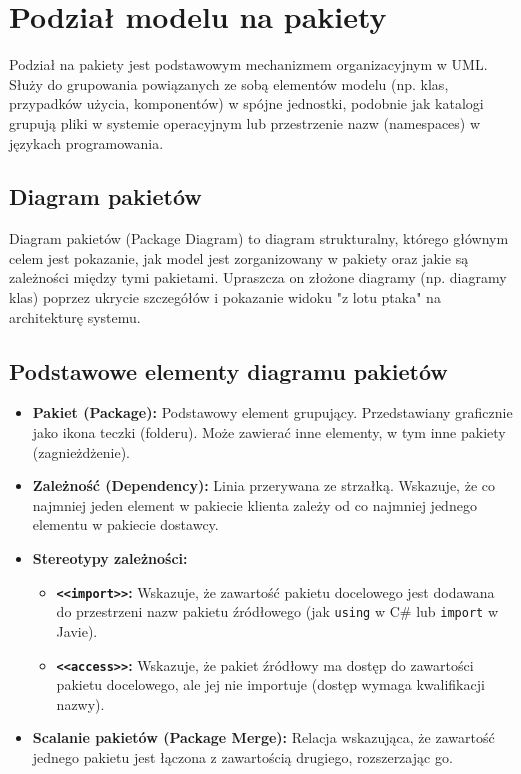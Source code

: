 \documentclass[a4paper,12pt]{article}
\begin{document}
\section{Podział modelu na pakiety}

Podział na pakiety jest podstawowym mechanizmem organizacyjnym w UML. Służy do grupowania powiązanych ze sobą elementów modelu (np. klas, przypadków użycia, komponentów) w spójne jednostki, podobnie jak katalogi grupują pliki w systemie operacyjnym lub przestrzenie nazw (namespaces) w językach programowania.

\subsection{Diagram pakietów}

Diagram pakietów (Package Diagram) to diagram strukturalny, którego głównym celem jest pokazanie, jak model jest zorganizowany w pakiety oraz jakie są zależności między tymi pakietami. Upraszcza on złożone diagramy (np. diagramy klas) poprzez ukrycie szczegółów i pokazanie widoku "z lotu ptaka" na architekturę systemu.

\subsection{Podstawowe elementy diagramu pakietów}
\begin{itemize}
    \item \textbf{Pakiet (Package):} Podstawowy element grupujący. Przedstawiany graficznie jako ikona teczki (folderu). Może zawierać inne elementy, w tym inne pakiety (zagnieżdżenie).
    \item \textbf{Zależność (Dependency):} Linia przerywana ze strzałką. Wskazuje, że co najmniej jeden element w pakiecie klienta zależy od co najmniej jednego elementu w pakiecie dostawcy.
    \item \textbf{Stereotypy zależności:}
        \begin{itemize}
            \item \textbf{\texttt{<<import>>}:} Wskazuje, że zawartość pakietu docelowego jest dodawana do przestrzeni nazw pakietu źródłowego (jak \texttt{using} w C\# lub \texttt{import} w Javie).
            \item \textbf{\texttt{<<access>>}:} Wskazuje, że pakiet źródłowy ma dostęp do zawartości pakietu docelowego, ale jej nie importuje (dostęp wymaga kwalifikacji nazwy).
        \end{itemize}
    \item \textbf{Scalanie pakietów (Package Merge):} Relacja wskazująca, że zawartość jednego pakietu jest łączona z zawartością drugiego, rozszerzając go.
\end{itemize}
\end{document}
